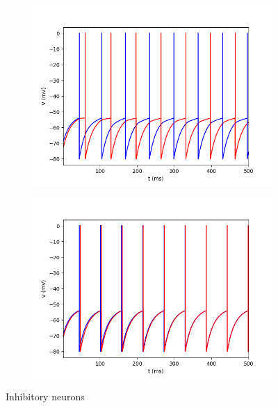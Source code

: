 \documentclass{article}
\begin{document}
\begin{figure}[h]
	\centering
	\begin{subfigure}[t]{0.45\linewidth}
		\centering
		\includegraphics[width = 1.0\linewidth, trim={0 0 0 0}, clip=true]{V_74i.png}
		\label{fig:V74}	
	\end{subfigure}%
	\hspace{0.05\linewidth}
	\begin{subfigure}[t]{0.45\linewidth}
		\centering
		\includegraphics[width = 1.0\linewidth, trim={0 0 0 0}, clip=true]{V_72i.png}
		\label{fig:V72}	
	\end{subfigure}%
\caption{Inhibitory neurons}
\label{fig:IFi}
\end{figure}
\end{document}
